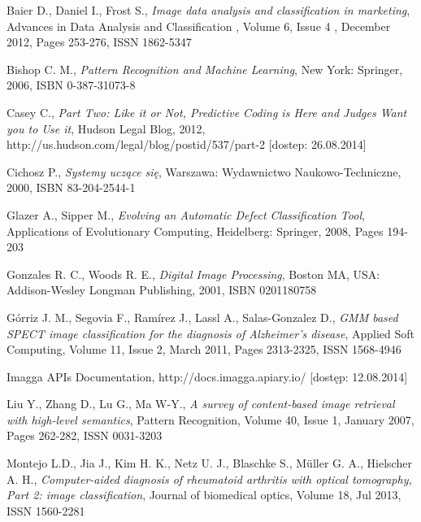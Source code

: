 \begin{thebibliography}{100} %

 Baier D., Daniel I., Frost S., \emph{Image data analysis and classification in marketing}, Advances in Data Analysis and Classification , Volume 6, Issue 4 , December 2012, Pages 253-276, ISSN 1862-5347

 Bishop C. M., \emph{Pattern Recognition and Machine Learning}, New York: Springer, 2006, ISBN 0-387-31073-8

 Casey C., \emph{Part Two: Like it or Not, Predictive Coding is Here and Judges Want you to Use it}, Hudson Legal Blog, 2012, http://us.hudson.com/legal/blog/postid/537/part-2 [dostep: 26.08.2014]

 Cichosz P., \emph{Systemy uczące się}, Warszawa: Wydawnictwo Naukowo-Techniczne, 2000, ISBN 83-204-2544-1

 Glazer A., Sipper M., \emph{Evolving an Automatic Defect Classification Tool}, Applications of Evolutionary Computing, Heidelberg: Springer, 2008, Pages 194-203

 Gonzales R. C., Woods R. E., \emph{Digital Image Processing}, Boston MA, USA: Addison-Wesley Longman Publishing, 2001, ISBN 0201180758

 Górriz J. M., Segovia F., Ramírez J., Lassl A., Salas-Gonzalez D., \emph{GMM based SPECT image classification for the diagnosis of Alzheimer’s disease}, Applied Soft Computing, Volume 11, Issue 2, March 2011, Pages 2313-2325, ISSN 1568-4946


 Imagga APIs Documentation, http://docs.imagga.apiary.io/ [dostęp: 12.08.2014]

 Liu Y., Zhang D., Lu G., Ma W-Y., \emph{A survey of content-based image retrieval with high-level semantics}, Pattern Recognition, Volume 40, Issue 1, January 2007, Pages 262-282, ISSN 0031-3203

 Montejo L.D., Jia J., Kim H. K., Netz U. J., Blaschke S., Müller G. A., Hielscher A. H., \emph{Computer-aided diagnosis of rheumatoid arthritis with optical tomography, Part 2: image classification}, Journal of biomedical optics, Volume 18, Jul 2013, ISSN 1560-2281


\end{thebibliography}

